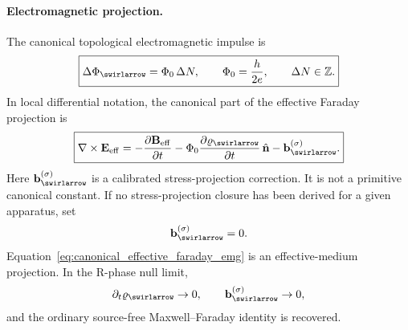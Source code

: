         \paragraph{Electromagnetic projection.}
        The canonical topological electromagnetic impulse is
        \begin{align}
            \boxed{
            \Delta\Phi_{\swirlarrow}
            =
            \Phi_0\,\Delta N,
            \qquad
            \Phi_0=\frac{h}{2e},
            \qquad
            \Delta N\in\mathbb{Z}.
            }
            \label{eq:canonical_em_flux_impulse_closure}
        \end{align}
        In local differential notation, the canonical part of the effective Faraday projection is
        \begin{align}
            \boxed{
            \nabla\times\mathbf{E}_{\mathrm{eff}}
            =
            -\frac{\partial\mathbf{B}_{\mathrm{eff}}}{\partial t}
            -
            \Phi_0\frac{\partial\varrho_{\swirlarrow}}{\partial t}\,\hat{\mathbf n}
            -
            \mathbf{b}^{(\sigma)}_{\swirlarrow}.
            }
            \label{eq:canonical_effective_faraday_emg}
        \end{align}
        Here \(\mathbf{b}^{(\sigma)}_{\swirlarrow}\) is a calibrated stress-projection correction. It is not a primitive canonical constant. If no stress-projection closure has been derived for a given apparatus, set
        \begin{align}
            \mathbf{b}^{(\sigma)}_{\swirlarrow}=0.
            \label{eq:stress_projection_zero_default}
        \end{align}
        Equation~\eqref{eq:canonical_effective_faraday_emg} is an effective-medium projection. In the R-phase null limit,
        \begin{align}
            \partial_t\varrho_{\swirlarrow}\to0,
            \qquad
            \mathbf{b}^{(\sigma)}_{\swirlarrow}\to0,
        \end{align}
        and the ordinary source-free Maxwell--Faraday identity is recovered.

